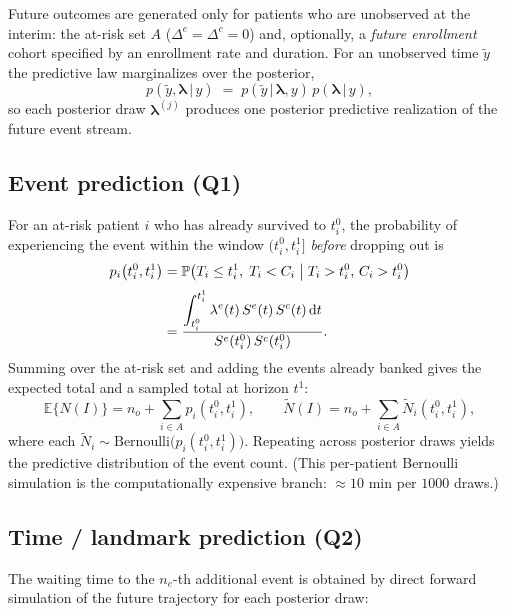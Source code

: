 \documentclass[11pt]{article}
\newcommand{\E}{\mathbb{E}}
\newcommand{\Prob}{\mathbb{P}}
\newcommand{\given}{\,\vert\,}
\newcommand{\dd}{\,\mathrm{d}}
\begin{document}
Future outcomes are generated only for patients who are unobserved at the
interim: the at-risk set $A$ ($\Delta^e=\Delta^c=0$) and, optionally, a
\emph{future enrollment} cohort specified by an enrollment rate and duration.
For an unobserved time $\tilde{y}$ the predictive law marginalizes over the
posterior,
\[
p(\tilde{y},\bm\lambda \given y) \;=\; p(\tilde{y}\given \bm\lambda, y)\,
p(\bm\lambda \given y),
\]
so each posterior draw $\bm\lambda^{(j)}$ produces one posterior predictive
realization of the future event stream.

\subsection*{Event prediction (Q1)}

For an at-risk patient $i$ who has already survived to $t^{0}_i$, the
probability of experiencing the event within the window $(t^{0}_i, t^{1}_i]$
\emph{before} dropping out is
\begin{align}
p_i\!\left(t^{0}_i, t^{1}_i\right)
&= \Prob\!\left(T_i \le t^1_i,\; T_i < C_i \;\middle|\; T_i > t^0_i,\, C_i > t^0_i\right)
\notag\\[3pt]
&= \frac{\displaystyle\int_{t^{0}_i}^{t^{1}_i}
\lambda^{e}(t)\,S^{e}(t)\,S^{c}(t)\dd t}
{\,S^{e}(t^{0}_i)\,S^{c}(t^{0}_i)\,}.
\label{eq:eventprob}
\end{align}
Summing over the at-risk set and adding the events already banked gives the
expected total and a sampled total at horizon $t^1$:
\[
\E\{N(I)\} = n_o + \sum_{i \in A} p_i\!\left(t^0_i, t^1_i\right),
\qquad
\widetilde{N}(I) = n_o + \sum_{i \in A}\widetilde{N}_i\!\left(t^0_i, t^1_i\right),
\]
where each $\widetilde{N}_i \sim \mathrm{Bernoulli}\big(p_i(t^0_i,t^1_i)\big)$.
Repeating across posterior draws yields the predictive distribution of the
event count. (This per-patient Bernoulli simulation is the computationally
expensive branch: $\approx 10$ min per $1000$ draws.)

\subsection*{Time / landmark prediction (Q2)}

The waiting time to the $n_e$-th additional event is obtained by direct
forward simulation of the future trajectory for each posterior draw:
\end{document}
